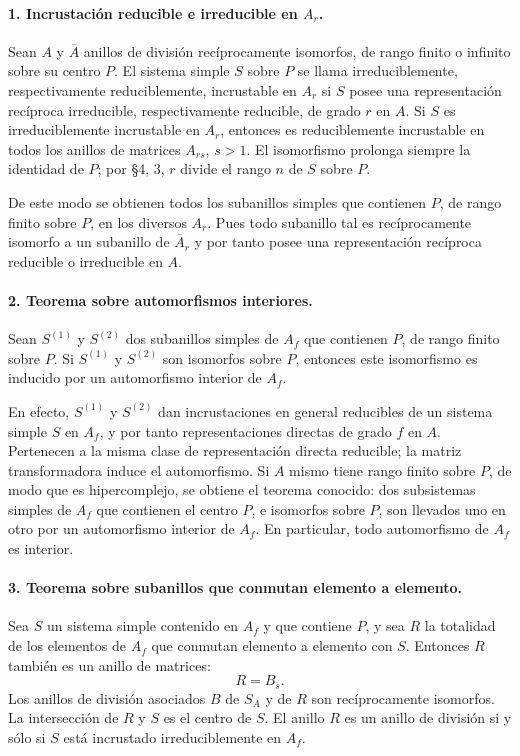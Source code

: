 \paragraph{1. Incrustación reducible e irreducible en \(A_r\).}
Sean \(A\) y \(\overline A\) anillos de división recíprocamente isomorfos, de rango finito o infinito sobre su centro \(P\). El sistema simple \(S\) sobre \(P\) se llama irreduciblemente, respectivamente reduciblemente, incrustable en \(A_r\) si \(S\) posee una representación recíproca irreducible, respectivamente reducible, de grado \(r\) en \(A\). Si \(S\) es irreduciblemente incrustable en \(A_r\), entonces es reduciblemente incrustable en todos los anillos de matrices \(A_{rs}\), \(s>1\). El isomorfismo prolonga siempre la identidad de \(P\); por §4, 3, \(r\) divide el rango \(n\) de \(S\) sobre \(P\).

De este modo se obtienen todos los subanillos simples que contienen \(P\), de rango finito sobre \(P\), en los diversos \(A_r\). Pues todo subanillo tal es recíprocamente isomorfo a un subanillo de \(\overline A_r\) y por tanto posee una representación recíproca reducible o irreducible en \(A\).

\paragraph{2. Teorema sobre automorfismos interiores.}
Sean \(S^{(1)}\) y \(S^{(2)}\) dos subanillos simples de \(A_f\) que contienen \(P\), de rango finito sobre \(P\). Si \(S^{(1)}\) y \(S^{(2)}\) son isomorfos sobre \(P\), entonces este isomorfismo es inducido por un automorfismo interior de \(A_f\).

En efecto, \(S^{(1)}\) y \(S^{(2)}\) dan incrustaciones en general reducibles de un sistema simple \(S\) en \(A_f\), y por tanto representaciones directas de grado \(f\) en \(A\). Pertenecen a la misma clase de representación directa reducible; la matriz transformadora induce el automorfismo. Si \(A\) mismo tiene rango finito sobre \(P\), de modo que es hipercomplejo, se obtiene el teorema conocido: dos subsistemas simples de \(A_f\) que contienen el centro \(P\), e isomorfos sobre \(P\), son llevados uno en otro por un automorfismo interior de \(A_f\). En particular, todo automorfismo de \(A_f\) es interior.

\paragraph{3. Teorema sobre subanillos que conmutan elemento a elemento.}
Sea \(S\) un sistema simple contenido en \(A_f\) y que contiene \(P\), y sea \(R\) la totalidad de los elementos de \(A_f\) que conmutan elemento a elemento con \(S\). Entonces \(R\) también es un anillo de matrices:
\[
        R=B_s.
\]
Los anillos de división asociados \(B\) de \(S_A\) y de \(R\) son recíprocamente isomorfos. La intersección de \(R\) y \(S\) es el centro de \(S\). El anillo \(R\) es un anillo de división si y sólo si \(S\) está incrustado irreduciblemente en \(A_f\).

